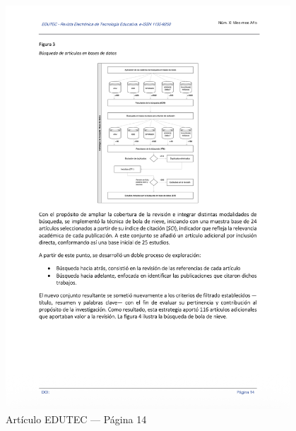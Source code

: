 \begin{figure}[H]
    \centering
    \begin{tcolorbox}[
        colback=white,
        colframe=gray!50,
        boxrule=1pt,
        arc=2pt,
        boxsep=5pt,
        left=3pt,
        right=3pt,
        top=3pt,
        bottom=3pt,
        drop shadow
    ]
        \includegraphics[width=0.95\textwidth,keepaspectratio]{apendices/EDUTEC/14.png}
    \end{tcolorbox}
    \caption{Artículo EDUTEC --- Página 14}\label{fig:edutec-pagina-14}
\end{figure}
\FloatBarrier


